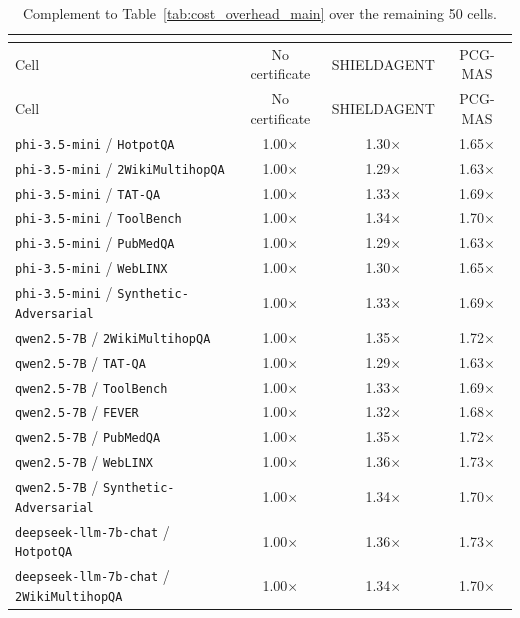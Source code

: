\begin{longtable}{lccc}
\caption{\small Complement to Table~\ref{tab:cost_overhead_main} over the remaining 50 cells.}\\
\label{tab:appendix_remaining_50_cost}\\
\toprule
Cell & No certificate & SHIELDAGENT & PCG-MAS \\
\midrule
\endfirsthead
\toprule
Cell & No certificate & SHIELDAGENT & PCG-MAS \\
\midrule
\endhead
\texttt{phi-3.5-mini} / \texttt{HotpotQA} & 1.00$\times$ & 1.30$\times$ & 1.65$\times$ \\
\texttt{phi-3.5-mini} / \texttt{2WikiMultihopQA} & 1.00$\times$ & 1.29$\times$ & 1.63$\times$ \\
\texttt{phi-3.5-mini} / \texttt{TAT-QA} & 1.00$\times$ & 1.33$\times$ & 1.69$\times$ \\
\texttt{phi-3.5-mini} / \texttt{ToolBench} & 1.00$\times$ & 1.34$\times$ & 1.70$\times$ \\
\texttt{phi-3.5-mini} / \texttt{PubMedQA} & 1.00$\times$ & 1.29$\times$ & 1.63$\times$ \\
\texttt{phi-3.5-mini} / \texttt{WebLINX} & 1.00$\times$ & 1.30$\times$ & 1.65$\times$ \\
\texttt{phi-3.5-mini} / \texttt{Synthetic-Adversarial} & 1.00$\times$ & 1.33$\times$ & 1.69$\times$ \\
\texttt{qwen2.5-7B} / \texttt{2WikiMultihopQA} & 1.00$\times$ & 1.35$\times$ & 1.72$\times$ \\
\texttt{qwen2.5-7B} / \texttt{TAT-QA} & 1.00$\times$ & 1.29$\times$ & 1.63$\times$ \\
\texttt{qwen2.5-7B} / \texttt{ToolBench} & 1.00$\times$ & 1.33$\times$ & 1.69$\times$ \\
\texttt{qwen2.5-7B} / \texttt{FEVER} & 1.00$\times$ & 1.32$\times$ & 1.68$\times$ \\
\texttt{qwen2.5-7B} / \texttt{PubMedQA} & 1.00$\times$ & 1.35$\times$ & 1.72$\times$ \\
\texttt{qwen2.5-7B} / \texttt{WebLINX} & 1.00$\times$ & 1.36$\times$ & 1.73$\times$ \\
\texttt{qwen2.5-7B} / \texttt{Synthetic-Adversarial} & 1.00$\times$ & 1.34$\times$ & 1.70$\times$ \\
\texttt{deepseek-llm-7b-chat} / \texttt{HotpotQA} & 1.00$\times$ & 1.36$\times$ & 1.73$\times$ \\
\texttt{deepseek-llm-7b-chat} / \texttt{2WikiMultihopQA} & 1.00$\times$ & 1.34$\times$ & 1.70$\times$ \\

\end{longtable}
